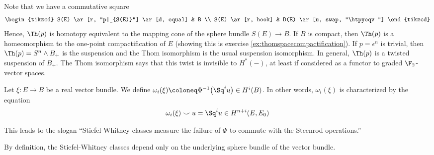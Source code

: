 Note that we have a commutative square
\begin{equation*}
	\begin{tikzcd}
		S(E)
				\ar[r, "p|_{S(E)}"]
				\ar[d, equal]
			& B
		\\
		S(E)
				\ar[r, hook]
			& D(E)
				\ar[u, swap, "\htpyeqv"]
	\end{tikzcd}
\end{equation*}
Hence, $\Th(p)$ is homotopy equivalent to the mapping cone of the sphere bundle $S(E) \to B$.
If $B$ is compact, then $\Th(p)$ is a homeomorphism to the one-point compactification of $E$ (showing this is exercise \ref{ex:thomspacecompactification}).
If $p = \epsilon^n$ is trivial, then $\Th(p) = S^n \wedge B_{+}$ is the suspension and the Thom isomorphism is the usual suspension isomorphism.
In general, $\Th(p)$ is a twisted suspension of $B_{+}$.
The Thom isomorphism says that this twist is invisible to $H^*({{-}})$, at least if considered as a functor to graded $\F_2$-vector spaces.
\begin{definition}
	Let $\xi\colon E \to B$ be a real vector bundle.
	We define $\omega_i(\xi) \coloneq \Phi^{-1}\big(\Sq^i u\big) \in H^i(B)$.
	In other words, $\omega_i(\xi)$ is characterized by the equation
	\begin{equation*}
		\omega_i(\xi) \smile u = \Sq^i u \in H^{n + i}(E, E_0)
	\end{equation*}
\end{definition}
This leads to the slogan \enquote{Stiefel-Whitney classes measure the failure of $\Phi$ to commute with the Steenrod operations.}
\begin{remark}
	By definition, the Stiefel-Whitney classes depend only on the underlying sphere bundle of the vector bundle.
\end{remark}
